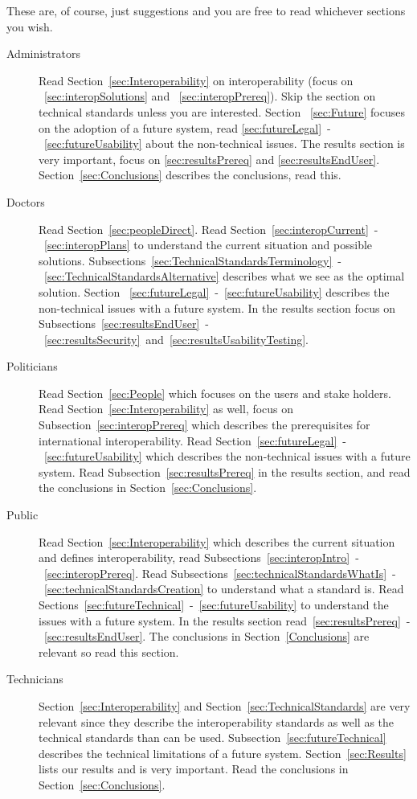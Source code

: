 \documentclass[14pt]{article}
\begin{document}
These are, of course, just suggestions and you are free to read whichever sections you wish.

\begin{description}
\item[Administrators] Read Section~\ref{sec:Interoperability} on interoperability (focus on ~\ref{sec:interopSolutions} and ~\ref{sec:interopPrereq}). Skip the section on technical standards unless you are interested. Section ~\ref{sec:Future} focuses on the adoption of a future system, read \ref{sec:futureLegal}~-~\ref{sec:futureUsability} about the non-technical issues. The results section is very important, focus on \ref{sec:resultsPrereq} and \ref{sec:resultsEndUser}. Section~\ref{sec:Conclusions} describes the conclusions, read this.
\item[Doctors] Read Section~\ref{sec:peopleDirect}. Read Section~\ref{sec:interopCurrent}~-~\ref{sec:interopPlans} to understand the current situation and possible solutions. Subsections~\ref{sec:TechnicalStandardsTerminology}~-~\ref{sec:TechnicalStandardsAlternative} describes what we see as the optimal solution. Section ~\ref{sec:futureLegal}~-~\ref{sec:futureUsability} describes the non-technical issues with a future system. In the results section focus on Subsections~\ref{sec:resultsEndUser}~-~\ref{sec:resultsSecurity}~and~\ref{sec:resultsUsabilityTesting}.
\item[Politicians] Read Section~\ref{sec:People} which focuses on the users and stake holders. Read Section~\ref{sec:Interoperability} as well, focus on Subsection~\ref{sec:interopPrereq} which describes the prerequisites for international interoperability. Read Section~\ref{sec:futureLegal}~-~\ref{sec:futureUsability} which describes the non-technical issues with a future system. Read Subsection~\ref{sec:resultsPrereq} in the results section, and read the conclusions in Section~\ref{sec:Conclusions}.
\item[Public] Read Section~\ref{sec:Interoperability} which describes the current situation and defines interoperability, read Subsections~\ref{sec:interopIntro}~-~\ref{sec:interopPrereq}. Read Subsections~\ref{sec:technicalStandardsWhatIs}~-~\ref{sec:technicalStandardsCreation} to understand what a standard is. Read Sections~\ref{sec:futureTechnical}~-~\ref{sec:futureUsability} to understand the issues with a future system. In the results section read~\ref{sec:resultsPrereq}~-~\ref{sec:resultsEndUser}. The conclusions in Section~\ref{Conclusions} are relevant so read this section.
\item[Technicians] Section~\ref{sec:Interoperability} and Section~\ref{sec:TechnicalStandards} are very relevant since they describe the interoperability standards as well as the technical standards than can be used. Subsection~\ref{sec:futureTechnical} describes the technical limitations of a future system. Section~\ref{sec:Results} lists our results and is very important. Read the conclusions in Section~\ref{sec:Conclusions}.


\end{description}
\end{document}
